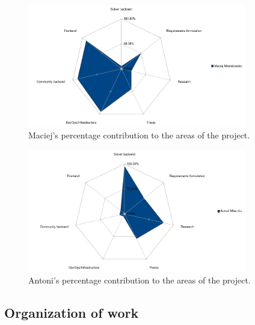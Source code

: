 \begin{figure}[H]
  \caption{Maciej's percentage contribution to the areas of the project.}
  \centering
  \includegraphics[width=0.85\textwidth]{assets/4-percentage-maciej.png}
\end{figure}

\begin{figure}[H]
  \caption{Antoni's percentage contribution to the areas of the project.}
  \centering
  \includegraphics[width=0.85\textwidth]{assets/4-percentage-antoni.png}
\end{figure}




\subsection{Organization of work}

